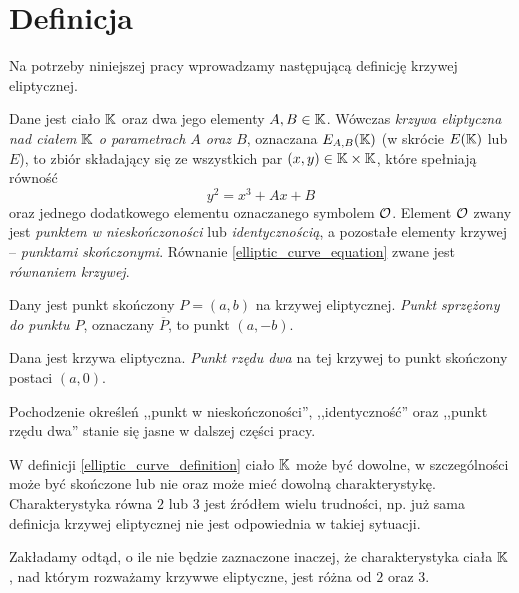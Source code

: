 \section{Definicja}

Na potrzeby niniejszej pracy wprowadzamy
następującą definicję krzywej eliptycznej.

\begin{definition}\label{elliptic_curve_definition}
Dane jest ciało $\mathbb{K}$ oraz dwa jego elementy $A, B \in \mathbb{K}$.
Wówczas \emph{krzywa eliptyczna nad ciałem $\mathbb{K}$ o parametrach $A$ oraz $B$},
oznaczana $E_{A,B}(\mathbb{K})$ (w skrócie $E(\mathbb{K})$ lub $E$),
to zbiór składający się
ze wszystkich par $(x, y) \in \mathbb{K} \times \mathbb{K}$, które spełniają równość
\begin{equation}\label{elliptic_curve_equation}
y^2 = x^3 + Ax + B
\end{equation}
oraz jednego dodatkowego elementu oznaczanego symbolem $\mathcal{O}$.
Element $\mathcal{O}$ zwany jest
\emph{punktem w nieskończoności} lub \emph{identycznością},
a pozostałe elementy krzywej -- \emph{punktami skończonymi}.
Równanie \ref{elliptic_curve_equation} zwane jest \emph{równaniem krzywej}.
\end{definition}

\begin{definition}
Dany jest punkt skończony $P = (a, b)$ na krzywej eliptycznej.
\emph{Punkt sprzężony do punktu $P$}, oznaczany $\overline{P}$,
to punkt $(a, -b)$.
\end{definition}

\begin{definition}
Dana jest krzywa eliptyczna.
\emph{Punkt rzędu dwa} na tej krzywej
to punkt skończony postaci $(a, 0)$.
\end{definition}

Pochodzenie określeń
,,punkt w nieskończoności'', ,,identyczność'' oraz ,,punkt rzędu dwa''
stanie się jasne w dalszej części pracy.

W definicji \ref{elliptic_curve_definition} ciało $\mathbb{K}$ może być dowolne,
w szczególności może być skończone lub nie
oraz może mieć dowolną charakterystykę.
Charakterystyka równa $2$ lub $3$ jest źródłem wielu trudności,
np. już sama definicja krzywej eliptycznej
nie jest odpowiednia w takiej sytuacji.

\begin{remark}
Zakładamy odtąd, o ile nie będzie zaznaczone inaczej,
że charakterystyka ciała $\mathbb{K}$, nad którym rozważamy krzywwe eliptyczne,
jest różna od $2$ oraz $3$.
\end{remark}

